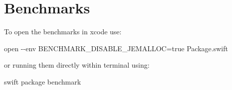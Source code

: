 \chapter{Benchmarks}
\hypertarget{md_flatbuffers_2benchmarks_2swift_2README}{}\label{md_flatbuffers_2benchmarks_2swift_2README}
To open the benchmarks in xcode use\+:

{\ttfamily open -\/-\/env BENCHMARK\+\_\+\+DISABLE\+\_\+\+JEMALLOC=true Package.\+swift}

or running them directly within terminal using\+:

{\ttfamily swift package benchmark} 